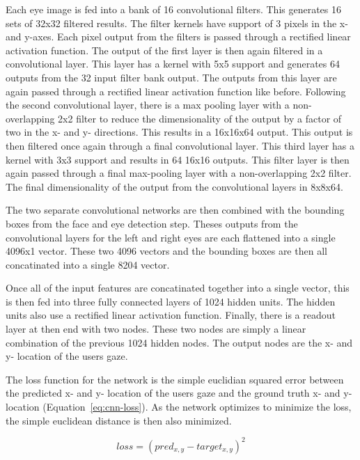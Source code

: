 \documentclass[10pt,twocolumn,letterpaper]{article}
\begin{document}
Each eye image is fed into a bank of 16 convolutional filters. This
generates 16 sets of 32x32 filtered results. The filter kernels have
support of 3 pixels in the x- and y-axes. Each pixel output from the
filters is passed through a rectified linear activation function. The
output of the first layer is then again filtered in a convolutional
layer. This layer has a kernel with 5x5 support and generates 64
outputs from the 32 input filter bank output. The outputs from this
layer are again passed through a rectified linear activation function
like before. Following the second convolutional layer, there is a max
pooling layer with a non-overlapping 2x2 filter to reduce the
dimensionality of the output by a factor of two in the x- and y-
directions. This results in a 16x16x64 output. This output is then
filtered once again through a final convolutional layer. This third
layer has a kernel with 3x3 support and results in 64 16x16
outputs. This filter layer is then again passed through a final
max-pooling layer with a non-overlapping 2x2 filter. The final
dimensionality of the output from the convolutional layers in 8x8x64.

The two separate convolutional networks are then combined with the
bounding boxes from the face and eye detection step. Theses outputs
from the convolutional layers for the left and right eyes are each
flattened into a single 4096x1 vector. These two 4096 vectors and the
bounding boxes are then all concatinated into a single 8204 vector.

Once all of the input features are concatinated together into a single
vector, this is then fed into three fully connected layers of 1024
hidden units. The hidden units also use a rectified linear activation
function. Finally, there is a readout layer at then end with two
nodes. These two nodes are simply a linear combination of the previous
1024 hidden nodes. The output nodes are the x- and y- location of the
users gaze.

The loss function for the network is the simple euclidian squared
error between the predicted x- and y- location of the users gaze and
the ground truth x- and y- location (Equation~\ref{eq:cnn-loss}). As
the network optimizes to minimize the loss, the simple euclidean
distance is then also minimized.

\begin{equation}
  loss = (pred_{x,y} - target_{x,y})^2
  \label{eq:cnn-loss}
\end{equation}
\end{document}

